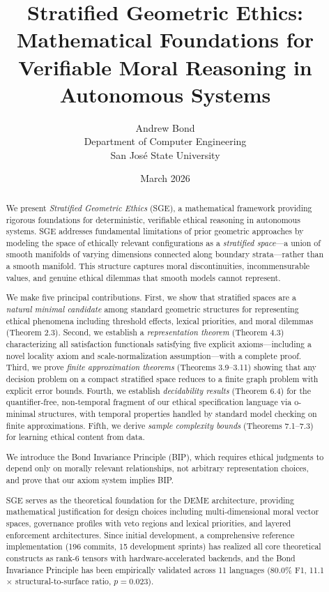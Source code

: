 \documentclass[12pt]{article}
\title{Stratified Geometric Ethics: Mathematical Foundations for
Verifiable Moral Reasoning in Autonomous Systems}
\author{Andrew Bond\\Department of Computer Engineering\\San Jos\'e State University}
\date{March 2026}
\theoremstyle{plain}
\theoremstyle{definition}
\theoremstyle{remark}
\begin{document}
\maketitle

\begin{abstract}
We present \emph{Stratified Geometric Ethics} (SGE), a mathematical
framework providing rigorous foundations for deterministic, verifiable
ethical reasoning in autonomous systems. SGE addresses fundamental
limitations of prior geometric approaches by modeling the space of
ethically relevant configurations as a \emph{stratified space}---a union
of smooth manifolds of varying dimensions connected along boundary
strata---rather than a smooth manifold. This structure captures moral
discontinuities, incommensurable values, and genuine ethical dilemmas
that smooth models cannot represent.

We make five principal contributions. First, we show that stratified
spaces are a \emph{natural minimal candidate} among standard geometric
structures for representing ethical phenomena including threshold
effects, lexical priorities, and moral dilemmas (Theorem 2.3). Second,
we establish a \emph{representation theorem} (Theorem 4.3)
characterizing all satisfaction functionals satisfying five explicit
axioms---including a novel locality axiom and scale-normalization
assumption---with a complete proof. Third, we prove \emph{finite
approximation theorems} (Theorems 3.9--3.11) showing that any decision
problem on a compact stratified space reduces to a finite graph problem
with explicit error bounds. Fourth, we establish \emph{decidability
results} (Theorem 6.4) for the quantifier-free, non-temporal fragment of
our ethical specification language via o-minimal structures, with
temporal properties handled by standard model checking on finite
approximations. Fifth, we derive \emph{sample complexity bounds}
(Theorems 7.1--7.3) for learning ethical content from data.

We introduce the Bond Invariance Principle (BIP), which requires ethical
judgments to depend only on morally relevant relationships, not
arbitrary representation choices, and prove that our axiom system
implies BIP.

SGE serves as the theoretical foundation for the DEME architecture,
providing mathematical justification for design choices including
multi-dimensional moral vector spaces, governance profiles with veto
regions and lexical priorities, and layered enforcement architectures.
Since initial development, a comprehensive reference implementation
(196 commits, 15 development sprints) has realized all core theoretical
constructs as rank-6 tensors with hardware-accelerated backends,
and the Bond Invariance Principle has been empirically validated across
11 languages (80.0\% F1, 11.1$\times$ structural-to-surface ratio,
\(p = 0.023\)).
\end{abstract}
\end{document}
